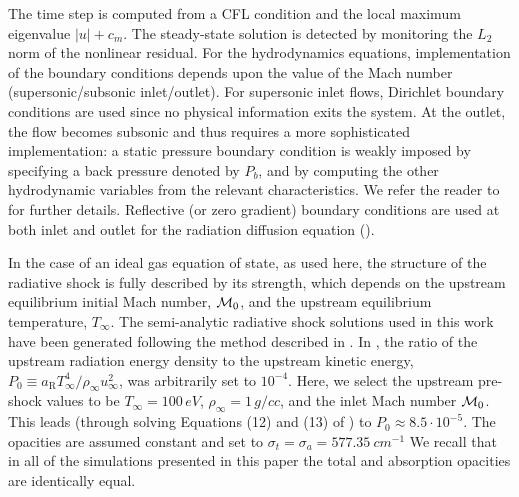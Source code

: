 \documentclass[times,doublespace]{fldauth}%
\begin{document}
The time step is computed from a CFL condition and the local maximum eigenvalue $|u|+c_m$.
The steady-state solution is detected by monitoring the $L_2$ norm of the nonlinear residual. 
For the hydrodynamics equations, implementation of the boundary conditions depends upon the value of the Mach number (supersonic/subsonic inlet/outlet).
For supersonic inlet flows, Dirichlet boundary conditions are used since no physical information exits the system.
At the outlet, the flow becomes subsonic and thus requires a more sophisticated implementation: a static pressure boundary condition is weakly imposed by specifying a back pressure denoted by $P_b$, and by computing the other hydrodynamic variables from the relevant characteristics. We refer the reader to  for further details.
Reflective (or zero gradient) boundary conditions are used at both inlet and outlet for the radiation diffusion equation ().

In the case of an ideal gas equation of state, as used here, the structure of the radiative shock is fully described by its strength, which depends on the upstream equilibrium initial Mach number, ${\cal M}_0$, and the upstream equilibrium temperature, $T_{\infty}$.
The semi-analytic radiative shock solutions used in this work have been generated following the method described in \cite{LowrieRauenzahn,LowrieEdwards}.
In \cite{LowrieEdwards}, the ratio of the upstream radiation energy density to the upstream kinetic energy, $P_0 \equiv a_{\textrm{R}} T_{\infty}^4 / \rho_{\infty} u_{\infty}^2$, was arbitrarily set to $10^{-4}$. Here, we select the upstream pre-shock values to be $T_{\infty} = 100\, eV$, $\rho_{\infty} = 1\, g/cc$, and the inlet Mach number ${\cal M}_0$. This leads
(through solving Equations (12) and (13) of \cite{LowrieRauenzahn}) to $P_0 \approx 8.5 \cdot 10^{-5}$. The opacities are assumed constant and set to $\sigma_t = \sigma_a = 577.35 \ cm^{-1}$ 
We recall that in all of the simulations presented in this paper the total and absorption opacities are identically equal.
\end{document}
